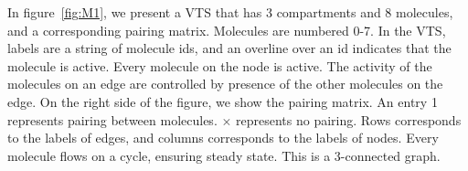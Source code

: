\begin{example}
%
In figure~\ref{fig:M1}, we present a VTS that has 3 compartments and 8 molecules, and a corresponding pairing matrix.
%
Molecules are numbered 0-7.
%
In the VTS, labels are a string of molecule ids, and an overline over an id indicates that the molecule is active.
%
Every molecule on the node is active.
%
The activity of the molecules on an edge are controlled
by presence of the other molecules on the edge.
%
On the right side of the figure, we show the pairing matrix.
%
An entry 1 represents pairing between molecules.
%
$\times$ represents no pairing.
%
Rows corresponds to the labels of edges, and
columns corresponds to the labels of nodes.
%
Every molecule flows on a cycle, ensuring steady state.
%
This is a 3-connected graph.
\end{example}

